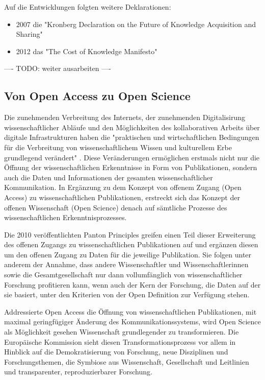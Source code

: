 Auf die Entwicklungen folgten weitere Deklarationen:
\begin{itemize}
\item 2007 die "Kronberg Declaration on the Future of Knowledge Acquisition and Sharing"
\item 2012 das "The Cost of Knowledge Manifesto"
\end{itemize}

---- TODO: weiter ausarbeiten ----

\subsection{Von Open Access zu Open Science}

Die zunehmenden Verbreitung des Internets, der zunehmenden Digitalisirung wissenschaftlicher Abläufe und den Möglichkeiten des kollaborativen Arbeits über digitale Infrastrukturen haben die "praktischen und wirtschaftlichen Bedingungen für die Verbreitung von wissenschaftlichem Wissen und kulturellem Erbe grundlegend verändert" \cite{berliner_erklaerung_2003}. Diese Veränderungen ermöglichen erstmals nicht nur die Öffnung der wissenschaftlichen Erkenntnisse in Form von Publikationen, sondern auch die Daten und Informationen der gesamten wissenschaftlicher Kommunikation. In Ergänzung zu dem Konzept von offenem Zugang (Open Access) zu wissenschaftlichen Publikationen, erstreckt sich das Konzept der offenen Wissenschaft (Open Science) denach auf sämtliche Prozesse des wissenschaftlichen Erkenntnisprozesses.

Die 2010 veröffentlichten Panton Principles greifen einen Teil dieser Erweiterung des offenen Zugangs zu wissenschaftlichen Publikationen auf und ergänzen diesen um den offenen Zugang zu Daten für die jeweilige Publikation. Sie folgen unter anderem der Annahme, dass andere Wissenschaftler und Wissenschaftlerinnen sowie die Gesamtgesellschaft nur dann vollumfänglich von wissenschaftlicher Forschung profitieren kann, wenn auch der Kern der Forschung, die Daten auf der sie basiert, unter den Kriterien von der Open Definition \cite{open_definition} zur Verfügung stehen.

Addressierte Open Access die Öffnung von wissenschaftlichen Publikationen, mit maximal geringfügiger Änderung des Kommunikationssystems, wird Open Science als Möglichkeit gesehen Wissenschaft grundlegender zu transformieren. Die Europäische Kommission sieht diesen Transformationsprozess vor allem in Hinblick auf die Demokratisierung von Forschung, neue Disziplinen und Forschungsthemen, die Symbiose aus Wissenschaft, Gesellschaft und Leitlinien und transparenter, reproduzierbarer Forschung.


